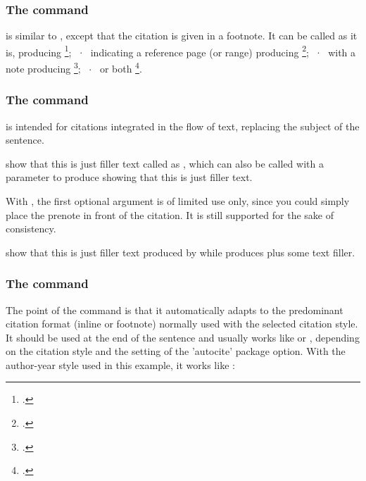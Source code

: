 \subsubsection*{The  command}

is similar to , except that the
citation is given in a footnote.
It can be called as it is,  producing \footcite{companion};
~$\cdot$~
indicating a reference page (or range)  producing \footcite[59]{companion};
~$\cdot$~
with a note  producing \footcite[see][]{companion};
~$\cdot$~
or both  \footcite[see][59--63]{companion}.

\subsubsection*{The  command}

is intended for citations integrated in the
flow of text, replacing the subject of the sentence.

\textcite{companion} show that this is just filler text called as
, which can also be called with a parameter
 to produce \textcite[59]{companion} showing
that this is just filler text.

With , the first optional argument is of limited use
only, since you could simply place the prenote in front of the
citation. It is still supported for the sake of consistency.

\textcite[see][]{companion} show that this is just filler text
produced by 
while  produces
\textcite[see][59--63]{companion} plus some text filler.


\subsubsection*{The  command}

The point of the  command is that it automatically adapts
to the predominant citation format (inline or footnote) normally
used with the selected citation style. It should be used at the
end of the sentence and usually works like  or
, depending on the citation style and the setting of the
'autocite' package option. With the author-year style used in this
example, it works like :

